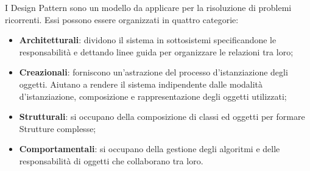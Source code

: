 I \gls{Design Pattern} sono un modello da applicare per la risoluzione di problemi ricorrenti. Essi possono essere organizzati in quattro categorie:
\begin{itemize}
	\item \textbf{Architetturali}: dividono il sistema in sottosistemi specificandone le responsabilità e dettando linee guida per organizzare le relazioni tra loro;
	\item \textbf{Creazionali}: forniscono un'astrazione del processo d'istanziazione degli oggetti. Aiutano a rendere il sistema indipendente dalle modalità d'istanziazione, composizione e rappresentazione degli oggetti utilizzati;
	\item \textbf{Strutturali}: si occupano della composizione di classi ed oggetti per formare Strutture complesse;
	\item \textbf{Comportamentali}: si occupano della gestione degli algoritmi e delle responsabilità di oggetti che collaborano tra loro.
\end{itemize}

